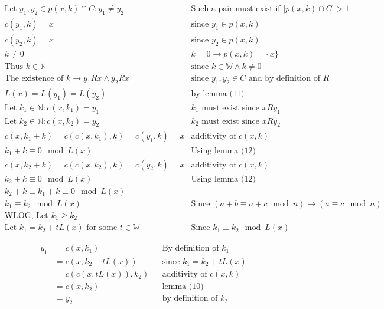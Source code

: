 \documentclass[11pt]{article}
\begin{document}
    \begin{align*}
        & \text{Let $y_{1},y_{2} \in p(x,k) \cap C: y_{1} \not = y_{2}$} & \text{Such a pair must exist if $|p(x,k) \cap C|>1$} \\
        & \text{$c(y_{1},k)=x$} & \text{since $y_{1}\in p(x,k)$} \\
        & \text{$c(y_{2},k)=x$} & \text{since $y_{2} \in p(x,k)$} \\
        & \text{$k\not = 0$} & \text{$k=0 \rightarrow p(x,k)=\{x\}$} \\
        & \text{Thus $k \in \mathbb{N}$} & \text{since $k \in \mathbb{W} \land k\not = 0$} \\
        & \text{The existence of $k \rightarrow y_{1}Rx \land y_{2}Rx$} & \text{since $y_{1},y_{2} \in C$ and by definition of $R$} \\
        & \text{$L(x)=L(y_{1})=L(y_{2})$} & \text{by lemma (11)} \\
        & \text{Let $k_{1} \in \mathbb{N}: c(x,k_{1})=y_{1}$} & \text{$k_{1}$ must exist since $xRy_{1}$} \\
        & \text{Let $k_{2} \in \mathbb{N}: c(x,k_{2})=y_{2}$} & \text{$k_{2}$ must exist since $xRy_{2}$} \\
        & \text{$c(x,k_{1}+k) = c(c(x,k_{1}),k) = c(y_{1},k) = x$} & \text{additivity of $c(x,k)$} \\
        & \text{$k_{1}+k \equiv 0 \mod L(x)$} & \text{Using lemma (12)} \\
        & \text{$c(x,k_{2}+k) = c(c(x,k_{2}),k) = c(y_{2},k) = x$} & \text{additivity of $c(x,k)$} \\
        & \text{$k_{2}+k \equiv 0 \mod L(x)$} & \text{Using lemma (12)} \\
        & \text{$k_{2}+k \equiv k_{1}+k \equiv 0 \mod L(x)$} & \text{} \\
        & \text{$k_{1} \equiv k_{2} \mod L(x)$} & \text{Since $(a+b\equiv a+c \mod n) \rightarrow (a\equiv c \mod n)$} \\
        & \text{WLOG, Let $k_{1}\geq k_{2}$} & \text{} \\
        & \text{Let $k_{1} = k_{2} + tL(x)$ for some $t \in \mathbb{W} $} & \text{Since $k_{1} \equiv k_{2} \mod L(x)$}
    \end{align*}

    \begin{align*}
        \text{$y_{1}$} &= \text{$c(x,k_{1})$} && \text{By definition of $k_{1}$} \\
        &= \text{$c(x,k_{2}+tL(x))$} && \text{since $k_{1} = k_{2}+tL(x)$} \\
        &= \text{$c(c(x,tL(x)),k_{2})$} && \text{additivity of $c(x,k)$} \\
        &= \text{$c(x,k_{2})$} && \text{lemma (10)} \\
        &= \text{$y_{2}$} && \text{by definition of $k_{2}$}
    \end{align*}
\end{document}

